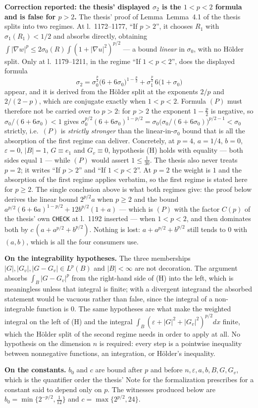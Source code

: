 \begin{lemma}
\medskip
\noindent\textbf{Correction reported: the thesis' displayed $\sigma_2$ is the
$1<p<2$ formula and is false for $p>2$.}  The thesis' proof of
Lemma~Lemma~4.1 of the thesis splits into two regimes.  At l.~1172--1177, ``If $p>2$'', it
chooses $R_1$ with $\sigma_1(R_1)<1/2$ and absorbs directly, obtaining
$\int|\nabla w|^p\le2\sigma_0(R)\int(1+|\nabla u|^2)^{p/2}$ --- a bound
\emph{linear} in $\sigma_0$, with no H\"older split.  Only at l.~1179--1211, in
the regime ``If $1<p<2$'', does the displayed formula
\[
\sigma_2=\sigma_0^{\frac p2}\bigl(6+6\sigma_0\bigr)^{1-\frac p2}
+\sigma_1^{\frac p2}\,6\bigl(1+\sigma_0\bigr)
\tag{P}
\]
appear, and it is derived from the H\"older split at the exponents $2/p$ and
$2/(2-p)$, which are conjugate exactly when $1<p<2$.  Formula $(P)$ must
therefore not be carried over to $p>2$: for $p>2$ the exponent $1-\frac p2$ is
negative, so $\sigma_0/(6+6\sigma_0)<1$ gives
$\sigma_0^{p/2}(6+6\sigma_0)^{1-p/2}
=\sigma_0\bigl(\sigma_0/(6+6\sigma_0)\bigr)^{p/2-1}<\sigma_0$ strictly, i.e.\
$(P)$ is \emph{strictly stronger} than the linear-in-$\sigma_0$ bound that is
all the absorption of the first regime can deliver.  Concretely, at $p=4$,
$a=1/4$, $b=0$, $\varepsilon=0$, $|B|=1$, $G\equiv e_1$ and $G_v\equiv0$,
hypothesis (H) holds with equality --- both sides equal $1$ --- while $(P)$
would assert $1\le\frac1{30}$.  The thesis also never treats $p=2$; it writes
``If $p>2$'' and ``If $1<p<2$''.  At $p=2$ the weight is $1$ and the absorption
of the first regime applies verbatim, so the first regime is stated here for
$p\ge2$.  The single conclusion above is what both regimes give: the proof below
derives the linear bound $2^{p/2}a$ when $p\ge2$ and the bound
$a^{p/2}(6+6a)^{1-p/2}+12b^{p/2}(1+a)$ --- which is $(P)$ with the factor
$C(p)$ of the thesis' own \texttt{CHECK} at l.~1192 inserted --- when
$1<p<2$, and then dominates both by $c\,(a+a^{p/2}+b^{p/2})$.  Nothing is lost:
$a+a^{p/2}+b^{p/2}$ still tends to $0$ with $(a,b)$, which is all the four
consumers use.

\medskip
\noindent\textbf{On the integrability hypotheses.}  The three memberships
$|G|,|G_v|,|G-G_v|\in L^p(B)$ and $|B|<\infty$ are not decoration.  The
argument absorbs $\int_B|G-G_v|^p$ from the right-hand side of (H) into the
left, which is meaningless unless that integral is finite; with a divergent
integrand the absorbed statement would be vacuous rather than false, since the
integral of a non-integrable function is $0$.  The same hypotheses are what make
the weighted integral on the left of (H) and the integral
$\int_B(\varepsilon+|G|^2+|G_v|^2)^{p/2}dx$ finite, which the H\"older split of
the second regime needs in order to apply at all.  No hypothesis on the
dimension $n$ is required: every step is a pointwise inequality between
nonnegative functions, an integration, or H\"older's inequality.

\medskip
\noindent\textbf{On the constants.}  $b_0$ and $c$ are bound after $p$ and
before $n,\varepsilon,a,b,B,G,G_v$, which is the quantifier order the thesis'
Note for the formalization prescribes for a constant said to depend only on $p$.
The witnesses produced below are
$b_0=\min\{2^{-p/2},\tfrac1{12}\}$ and $c=\max\{2^{p/2},24\}$.
\end{lemma}
